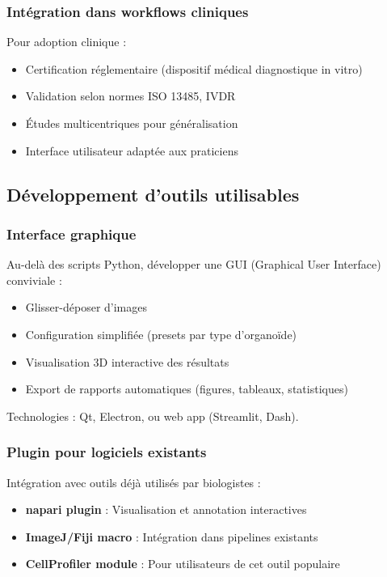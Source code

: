 \subsubsection{Intégration dans workflows cliniques}

Pour adoption clinique :
\begin{itemize}
    \item Certification réglementaire (dispositif médical diagnostique in vitro)
    \item Validation selon normes ISO 13485, IVDR
    \item Études multicentriques pour généralisation
    \item Interface utilisateur adaptée aux praticiens
\end{itemize}

\subsection{Développement d'outils utilisables}

\subsubsection{Interface graphique}

Au-delà des scripts Python, développer une GUI (Graphical User Interface) conviviale :
\begin{itemize}
    \item Glisser-déposer d'images
    \item Configuration simplifiée (presets par type d'organoïde)
    \item Visualisation 3D interactive des résultats
    \item Export de rapports automatiques (figures, tableaux, statistiques)
\end{itemize}

Technologies : Qt, Electron, ou web app (Streamlit, Dash).

\subsubsection{Plugin pour logiciels existants}

Intégration avec outils déjà utilisés par biologistes :
\begin{itemize}
    \item \textbf{napari plugin} : Visualisation et annotation interactives
    \item \textbf{ImageJ/Fiji macro} : Intégration dans pipelines existants
    \item \textbf{CellProfiler module} : Pour utilisateurs de cet outil populaire
\end{itemize}

